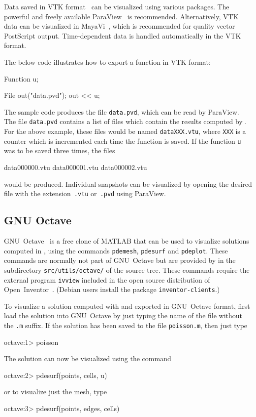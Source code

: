 Data saved in VTK format~\cite{www:VTK} can be visualized using various
packages. The powerful and freely available ParaView~\cite{www:ParaView} 
is recommended. Alternatively, VTK data can be visualized in 
MayaVi~\cite{www:MayaVi}, which is recommended for quality vector PostScript 
output. Time-dependent data is handled automatically in the VTK format.

The below code illustrates how to export a function in VTK format:
\begin{code}
Function u;

File out("data.pvd");
out << u;
\end{code}
The sample code produces the file \texttt{data.pvd}, which can be read 
by ParaView. The file \texttt{data.pvd} contains a list of files which 
contain the results computed by \dolfin{}. For the above example, these 
files would be named \texttt{dataXXX.vtu}, where \texttt{XXX} is a counter 
which is incremented each time the function is saved. If the function 
\texttt{u} was to be saved three times, the files
\begin{code}
data000000.vtu
data000001.vtu
data000002.vtu
\end{code}
would be produced. Individual snapshots can be visualized by opening the 
desired file with the extension~\texttt{.vtu} or~\texttt{.pvd} using ParaView.

\subsection{GNU Octave}

GNU~Octave~\cite{www:Octave} is a free clone of MATLAB that can be
used to visualize solutions computed in \dolfin{}, using the commands
\texttt{pdemesh}, \texttt{pdesurf} and \texttt{pdeplot}. These
commands are normally not part of GNU~Octave but are
provided by \dolfin{} in the subdirectory \texttt{src/utils/octave/} of
the \dolfin{} source tree. These commands require the external program
\texttt{ivview} included in the open source distribution of
Open~Inventor~\cite{www:OpenInventor}. (Debian users install the
package \texttt{inventor-clients}.)

To visualize a solution computed with \dolfin{} and exported in
GNU~Octave format, first load the solution into GNU~Octave by just
typing the name of the file without the \texttt{.m} suffix. If the
solution has been saved to the file \texttt{poisson.m}, then just type
\begin{code}
octave:1> poisson
\end{code}
The solution can now be visualized using the command
\begin{code}
octave:2> pdesurf(points, cells, u)
\end{code}
or to visualize just the mesh, type
\begin{code}
octave:3> pdesurf(points, edges, cells)
\end{code}

